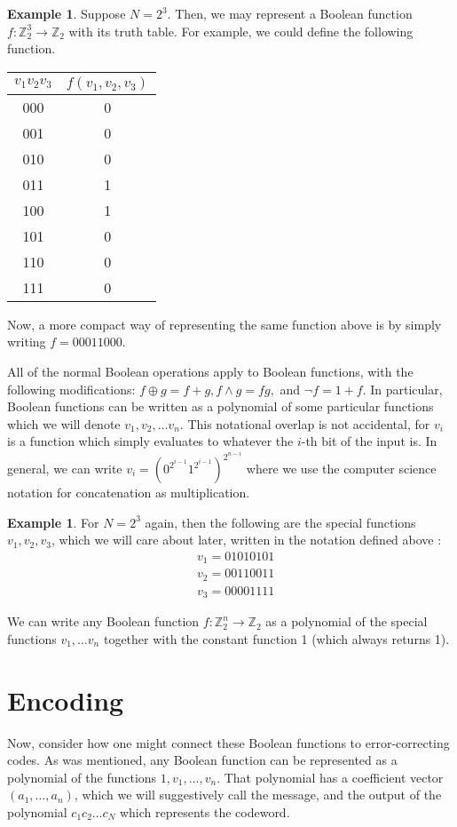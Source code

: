 \documentclass[12pt,twoside]{reedthesis}
\theoremstyle{definition}
\newtheorem{example}[theorem]{Example}
\newcommand{\Z}{\mathbb{Z}}
\begin{document}
\begin{example}
Suppose $N = 2^3$. Then, we may represent a Boolean function $f: \Z_2^3 \rightarrow \Z_2$ with its truth table. For example, we could define the following function.
\begin{center}
\begin{tabular}{ |c|c| } 
 \hline
$ v_1v_2v_3$ &$f(v_1, v_2, v_3)$  \\ 
\hline
000 & 0  \\ 
001 & 0 \\
010 & 0 \\
011 & 1\\
100 & 1\\
101 & 0\\
110 & 0\\
111 & 0 \\
 \hline
\end{tabular}
\end{center}
Now, a more compact way of representing the same function above is by simply writing $f = 00011000$. 
\end{example}
All of the normal Boolean operations apply to Boolean functions, with the following modifications: $f \oplus g = f+g, f \land g = fg, $ and $\lnot f = 1 + f$. In particular, Boolean functions can be written as a polynomial of some particular functions which we will denote $v_1, v_2, \ldots v_n$. This notational overlap is not accidental, for $v_i$ is a function which simply evaluates to whatever the $i$-th bit of the input is. In general, we can write $v_i = (0^{2^{i-1}} 1^{2^{i-1}})^{2^{n-i}}$ where we use the computer science notation for concatenation as multiplication.
\begin{example}
For $N=2^3$ again, then the following are the special functions $v_1, v_2, v_3$, which we will care about later,  written in the notation defined above :
\begin{align*}
& v_1 = 01010101 \\
& v_2 = 00110011\\
&v_3 = 00001111
\end{align*}
\end{example}
We can write any Boolean function $f: \Z_2^n \rightarrow \Z_2$ as a polynomial of the special functions $v_1, \ldots v_n$ together with the constant function 1 (which always returns 1). 
\section{Encoding}
Now, consider how one might connect these Boolean functions to error-correcting codes. As was mentioned, any Boolean function can be represented as a polynomial of the functions $1, v_1, \ldots, v_n$. That polynomial has a coefficient vector $(a_1, \ldots, a_n)$, which we will suggestively call the message, and the output of the polynomial $c_1c_2 \ldots c_N$ which represents the codeword. 
\end{document}
